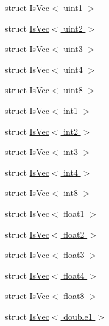 \begin{DoxyCompactItemize}
\item 
struct \hyperlink{structcv_1_1gpu_1_1device_1_1type__traits__detail_1_1IsVec_3_01uint1_01_4}{Is\-Vec$<$ uint1 $>$}
\item 
struct \hyperlink{structcv_1_1gpu_1_1device_1_1type__traits__detail_1_1IsVec_3_01uint2_01_4}{Is\-Vec$<$ uint2 $>$}
\item 
struct \hyperlink{structcv_1_1gpu_1_1device_1_1type__traits__detail_1_1IsVec_3_01uint3_01_4}{Is\-Vec$<$ uint3 $>$}
\item 
struct \hyperlink{structcv_1_1gpu_1_1device_1_1type__traits__detail_1_1IsVec_3_01uint4_01_4}{Is\-Vec$<$ uint4 $>$}
\item 
struct \hyperlink{structcv_1_1gpu_1_1device_1_1type__traits__detail_1_1IsVec_3_01uint8_01_4}{Is\-Vec$<$ uint8 $>$}
\item 
struct \hyperlink{structcv_1_1gpu_1_1device_1_1type__traits__detail_1_1IsVec_3_01int1_01_4}{Is\-Vec$<$ int1 $>$}
\item 
struct \hyperlink{structcv_1_1gpu_1_1device_1_1type__traits__detail_1_1IsVec_3_01int2_01_4}{Is\-Vec$<$ int2 $>$}
\item 
struct \hyperlink{structcv_1_1gpu_1_1device_1_1type__traits__detail_1_1IsVec_3_01int3_01_4}{Is\-Vec$<$ int3 $>$}
\item 
struct \hyperlink{structcv_1_1gpu_1_1device_1_1type__traits__detail_1_1IsVec_3_01int4_01_4}{Is\-Vec$<$ int4 $>$}
\item 
struct \hyperlink{structcv_1_1gpu_1_1device_1_1type__traits__detail_1_1IsVec_3_01int8_01_4}{Is\-Vec$<$ int8 $>$}
\item 
struct \hyperlink{structcv_1_1gpu_1_1device_1_1type__traits__detail_1_1IsVec_3_01float1_01_4}{Is\-Vec$<$ float1 $>$}
\item 
struct \hyperlink{structcv_1_1gpu_1_1device_1_1type__traits__detail_1_1IsVec_3_01float2_01_4}{Is\-Vec$<$ float2 $>$}
\item 
struct \hyperlink{structcv_1_1gpu_1_1device_1_1type__traits__detail_1_1IsVec_3_01float3_01_4}{Is\-Vec$<$ float3 $>$}
\item 
struct \hyperlink{structcv_1_1gpu_1_1device_1_1type__traits__detail_1_1IsVec_3_01float4_01_4}{Is\-Vec$<$ float4 $>$}
\item 
struct \hyperlink{structcv_1_1gpu_1_1device_1_1type__traits__detail_1_1IsVec_3_01float8_01_4}{Is\-Vec$<$ float8 $>$}
\item 
struct \hyperlink{structcv_1_1gpu_1_1device_1_1type__traits__detail_1_1IsVec_3_01double1_01_4}{Is\-Vec$<$ double1 $>$}
\item 

\end{DoxyCompactItemize}
